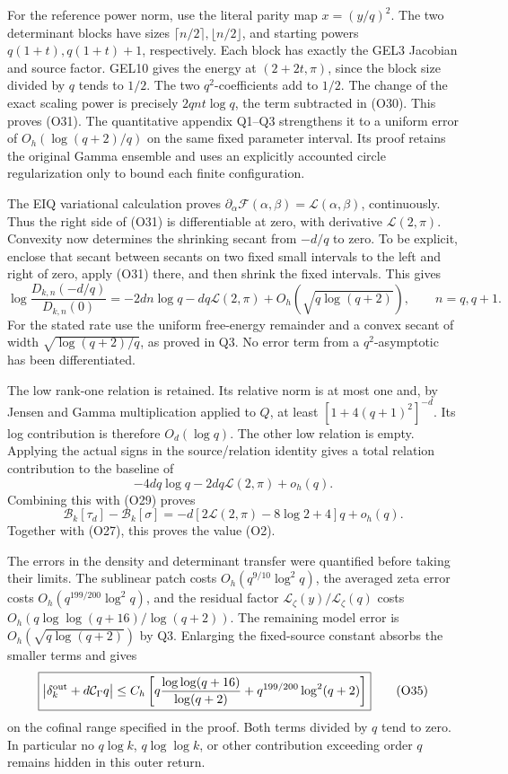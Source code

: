For the reference power norm, use the literal parity map \(x=(y/q)^2\).
The two determinant blocks have sizes
\(\lceil n/2\rceil,\lfloor n/2\rfloor\), and starting powers
\(q(1+t),q(1+t)+1\), respectively. Each block has exactly the GEL3
Jacobian and source factor. GEL10 gives the energy at \((2+2t,\pi)\),
since the block size divided by \(q\) tends to \(1/2\). The two
\(q^2\)-coefficients add to \(1/2\). The change of the exact scaling
power is precisely \(2qnt\log q\), the term subtracted in (O30). This
proves (O31). The quantitative appendix Q1--Q3 strengthens it to a
uniform error of \(O_h(\log(q+2)/q)\) on the same fixed parameter
interval. Its proof retains the original Gamma ensemble and uses an
explicitly accounted circle regularization only to bound each finite
configuration.

The EIQ variational calculation proves
\(\partial_\alpha\mathcal F(\alpha,\beta)=\mathcal L(\alpha,\beta)\),
continuously. Thus the right side of (O31) is differentiable at zero,
with derivative \(\mathcal L(2,\pi)\). Convexity now determines the
shrinking secant from \(-d/q\) to zero. To be explicit, enclose that
secant between secants on two fixed small intervals to the left and
right of zero, apply (O31) there, and then shrink the fixed intervals.
This gives \[
\boxed{\log\frac{D_{k,n}(-d/q)}{D_{k,n}(0)}
=-2dn\log q-dq\mathcal L(2,\pi)+O_h(\sqrt{q\log(q+2)}),
\qquad n=q,q+1.}\tag{O33}
\] For the stated rate use the uniform free-energy remainder and a
convex secant of width \(\sqrt{\log(q+2)/q}\), as proved in Q3. No error
term from a \(q^2\)-asymptotic has been differentiated.

The low rank-one relation is retained. Its relative norm is at most one
and, by Jensen and Gamma multiplication applied to \(Q\), at least
\([1+4(q+1)^2]^{-d}\). Its log contribution is therefore
\(O_d(\log q)\). The other low relation is empty. Applying the actual
signs in the source/relation identity gives a total relation
contribution to the baseline of \[
-4dq\log q-2dq\mathcal L(2,\pi)+o_h(q).\tag{O34}
\] Combining this with (O29) proves \[
\mathcal B_k[\tau_d]-\mathcal B_k[\sigma]
=-d[2\mathcal L(2,\pi)-8\log2+4]q+o_h(q).
\] Together with (O27), this proves the value (O2).

The errors in the density and determinant transfer were quantified
before taking their limits. The sublinear patch costs
\(O_h(q^{9/10}\log^2q)\), the averaged zeta error costs
\(O_h(q^{199/200}\log^2q)\), and the residual factor
\(\mathcal L_\zeta(y)/\mathcal L_\zeta(q)\) costs
\(O_h(q\log\log(q+16)/\log(q+2))\). The remaining model error is
\(O_h(\sqrt{q\log(q+2)})\) by Q3. Enlarging the fixed-source constant
absorbs the smaller terms and gives \[
\boxed{\left|\delta_k^{\rm out}+d\mathcal C_\Gamma q\right|
\le C_h\left[
q\frac{\log\log(q+16)}{\log(q+2)}
+q^{199/200}\log^2(q+2)\right]}
\tag{O35}
\] on the cofinal range specified in the proof. Both terms divided by
\(q\) tend to zero. In particular no \(q\log k\), \(q\log\log k\), or
other contribution exceeding order \(q\) remains hidden in this outer
return.


